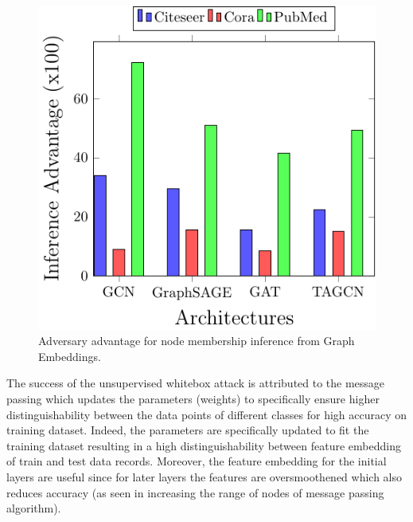 \begin{figure}[t]
  \begin{center}
    \includegraphics[width=0.5\linewidth]{figures/EmbeddingMIA/whiteboxMIA.pdf}
  \end{center}
  \caption{Adversary advantage for node membership inference from Graph Embeddings.}
  \label{fig:whitebox}
\end{figure}



\noindent The success of the unsupervised whitebox attack is attributed to the message passing which updates the parameters (weights) to specifically ensure higher distinguishability between the data points of different classes for high accuracy on training dataset.
Indeed, the parameters are specifically updated to fit the training dataset resulting in a high distinguishability between feature embedding of train and test data records.
Moreover, the feature embedding for the initial layers are useful since for later layers the features are oversmoothened which also reduces accuracy (as seen in increasing the range of nodes of message passing algorithm).

